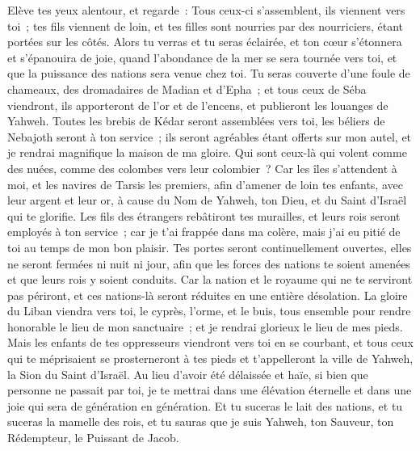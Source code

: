 \begin{multicols}{2}
Elève tes yeux alentour, et regarde~: Tous ceux-ci s'assemblent, ils viennent vers toi~; tes fils viennent de loin, et tes filles sont nourries par des nourriciers, étant portées sur les côtés.
Alors tu verras et tu seras éclairée, et ton cœur s'étonnera et s'épanouira de joie, quand l'abondance de la mer se sera tournée vers toi, et que la puissance des nations sera venue chez toi.
Tu seras couverte d'une foule de chameaux, des dromadaires de Madian et d'Epha~; et tous ceux de Séba viendront, ils apporteront de l'or et de l'encens, et publieront les louanges de Yahweh.
Toutes les brebis de Kédar seront assemblées vers toi, les béliers de Nebajoth seront à ton service~; ils seront agréables étant offerts sur mon autel, et je rendrai magnifique la maison de ma gloire.
Qui sont ceux-là qui volent comme des nuées, comme des colombes vers leur colombier~?
Car les îles s'attendent à moi, et les navires de Tarsis les premiers, afin d'amener de loin tes enfants, avec leur argent et leur or, à cause du Nom de Yahweh, ton Dieu, et du Saint d'Israël qui te glorifie.
Les fils des étrangers rebâtiront tes murailles, et leurs rois seront employés à ton service~; car je t'ai frappée dans ma colère, mais j'ai eu pitié de toi au temps de mon bon plaisir.
Tes portes seront continuellement ouvertes, elles ne seront fermées ni nuit ni jour, afin que les forces des nations te soient amenées et que leurs rois y soient conduits.
Car la nation et le royaume qui ne te serviront pas périront, et ces nations-là seront réduites en une entière désolation.
La gloire du Liban viendra vers toi, le cyprès, l'orme, et le buis, tous ensemble pour rendre honorable le lieu de mon sanctuaire~; et je rendrai glorieux le lieu de mes pieds.
Mais les enfants de tes oppresseurs viendront vers toi en se courbant, et tous ceux qui te méprisaient se prosterneront à tes pieds et t'appelleront la ville de Yahweh, la Sion du Saint d'Israël.
Au lieu d'avoir été délaissée et haïe, si bien que personne ne passait par toi, je te mettrai dans une élévation éternelle et dans une joie qui sera de génération en génération.
Et tu suceras le lait des nations, et tu suceras la mamelle des rois, et tu sauras que je suis Yahweh, ton Sauveur, ton Rédempteur, le Puissant de Jacob.

\end{multicols}
